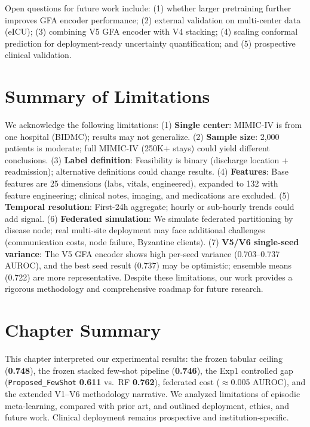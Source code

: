 Open questions for future work include: (1) whether larger pretraining further improves GFA encoder performance; (2) external validation on multi-center data (eICU); (3) combining V5 GFA encoder with V4 stacking; (4) scaling conformal prediction for deployment-ready uncertainty quantification; and (5) prospective clinical validation.

\section{Summary of Limitations}

We acknowledge the following limitations: (1) \textbf{Single center}: MIMIC-IV is from one hospital (BIDMC); results may not generalize. (2) \textbf{Sample size}: 2,000 patients is moderate; full MIMIC-IV (250K+ stays) could yield different conclusions. (3) \textbf{Label definition}: Feasibility is binary (discharge location + readmission); alternative definitions could change results. (4) \textbf{Features}: Base features are 25 dimensions (labs, vitals, engineered), expanded to 132 with feature engineering; clinical notes, imaging, and medications are excluded. (5) \textbf{Temporal resolution}: First-24h aggregate; hourly or sub-hourly trends could add signal. (6) \textbf{Federated simulation}: We simulate federated partitioning by disease node; real multi-site deployment may face additional challenges (communication costs, node failure, Byzantine clients). (7) \textbf{V5/V6 single-seed variance}: The V5 GFA encoder shows high per-seed variance (0.703--0.737 AUROC), and the best seed result (0.737) may be optimistic; ensemble means (0.722) are more representative. Despite these limitations, our work provides a rigorous methodology and comprehensive roadmap for future research.

\section{Chapter Summary}

This chapter interpreted our experimental results: the frozen tabular ceiling (\textbf{0.748}), the frozen stacked few-shot pipeline (\textbf{0.746}), the Exp1 controlled gap (\texttt{Proposed\_FewShot} \textbf{0.611} vs.\ RF \textbf{0.762}), federated cost ($\approx$0.005 AUROC), and the extended V1--V6 methodology narrative. We analyzed limitations of episodic meta-learning, compared with prior art, and outlined deployment, ethics, and future work. Clinical deployment remains prospective and institution-specific.

